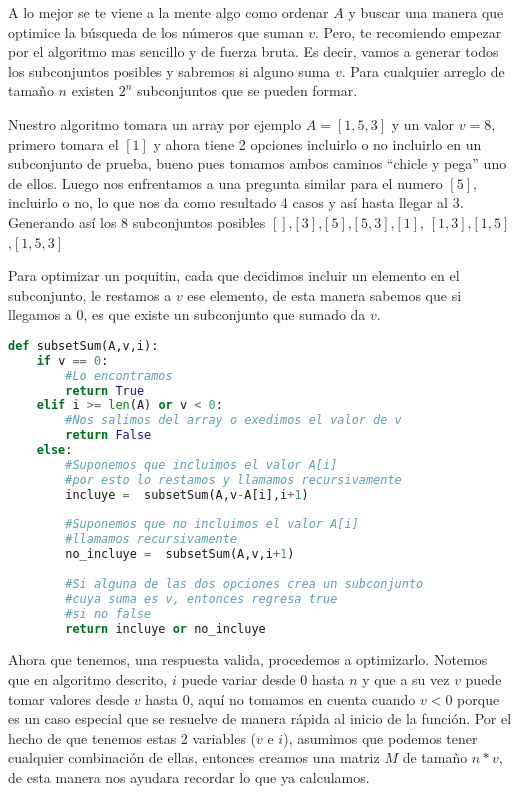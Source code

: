 A lo mejor se te viene a la mente algo como ordenar $A$ y buscar una manera que optimice la búsqueda de los números que suman $v$. Pero, te recomiendo empezar por el algoritmo mas sencillo y de fuerza bruta. Es decir, vamos a generar todos los subconjuntos posibles y sabremos si alguno suma $v$. Para cualquier arreglo de tamaño $n$ existen $2^n$ subconjuntos que se pueden formar.

Nuestro algoritmo tomara un array por ejemplo $A=[1,5,3]$ y un valor $v=8$, primero tomara el $[1]$ y ahora tiene 2 opciones incluirlo o no incluirlo en un subconjunto de prueba, bueno pues tomamos ambos caminos ``chicle y pega'' uno de ellos. Luego nos enfrentamos a una pregunta similar para el numero $[5]$, incluirlo o no, lo que nos da como resultado 4 casos y así hasta llegar al 3. Generando así los 8 subconjuntos posibles $[]$,$[3]$,$[5]$,$[5,3]$,$[1]$,  $[1,3]$,$[1,5]$,$[1,5,3]$

Para optimizar un poquitin,  cada que decidimos incluir un elemento en el subconjunto, le restamos a $v$ ese elemento, de esta manera sabemos que si llegamos a 0, es que existe un subconjunto que sumado da $v$.
 
\begin{lstlisting}[language=Python, caption=Subset sum no optimo]
def subsetSum(A,v,i):
    if v == 0:
        #Lo encontramos
        return True
    elif i >= len(A) or v < 0:
        #Nos salimos del array o exedimos el valor de v
        return False
    else:
        #Suponemos que incluimos el valor A[i]
        #por esto lo restamos y llamamos recursivamente
        incluye =  subsetSum(A,v-A[i],i+1)
        
        #Suponemos que no incluimos el valor A[i]
        #llamamos recursivamente
        no_incluye =  subsetSum(A,v,i+1)
        
        #Si alguna de las dos opciones crea un subconjunto
        #cuya suma es v, entonces regresa true
        #si no false
        return incluye or no_incluye
\end{lstlisting}

Ahora que tenemos, una respuesta valida, procedemos a optimizarlo. Notemos que en algoritmo descrito, $i$ puede variar desde 0 hasta $n$ y que a su vez $v$ puede tomar valores desde $v$ hasta $0$, aquí no tomamos en cuenta cuando $v < 0$ porque es un caso especial que se resuelve de manera rápida al inicio de la función. Por el hecho de que tenemos estas 2 variables ($v$ e $i$), asumimos que podemos tener cualquier combinación de ellas, entonces creamos una matriz $M$ de tamaño $n*v$, de esta manera nos ayudara recordar lo que ya calculamos.


